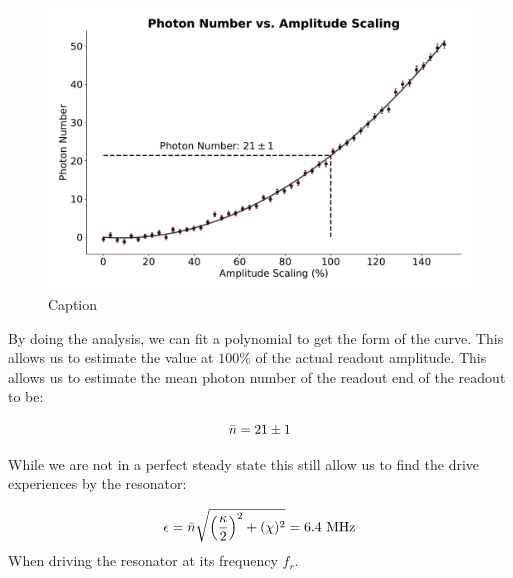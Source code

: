 \begin{figure}
    \centering
    \includegraphics[]{Calibrations/Figures/photon_number.pdf}
    \caption{Caption}
    \label{fig:calibration_amplitude_photon_number}
\end{figure}

By doing the analysis, we can fit a polynomial to get the form of the curve. This allows us to estimate the value at $100\%$ of the actual readout amplitude. This allows us to estimate the mean photon number of the readout end of the readout to be:

\begin{equation}
    \Bar{n} = 21 \pm 1
\end{equation}

While we are not in a perfect steady state this still allow us to find the drive experiences by the resonator:

\begin{equation}
    \epsilon = \Bar{n} \sqrt{\left(\frac{\kappa}{2}\right)^2 + (\chi)^2} = 6.4 \text{ MHz}
\end{equation}
When driving the resonator at its frequency $f_r$.








